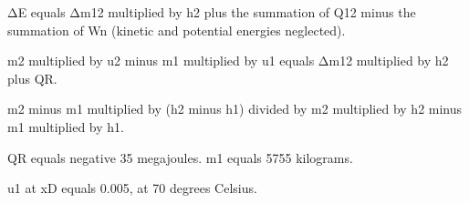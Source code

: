 ΔE equals Δm12 multiplied by h2 plus the summation of Q12 minus the summation of Wn (kinetic and potential energies neglected).  

m2 multiplied by u2 minus m1 multiplied by u1 equals Δm12 multiplied by h2 plus QR.  

m2 minus m1 multiplied by (h2 minus h1) divided by m2 multiplied by h2 minus m1 multiplied by h1.  

QR equals negative 35 megajoules.  
m1 equals 5755 kilograms.  

u1 at xD equals 0.005, at 70 degrees Celsius.